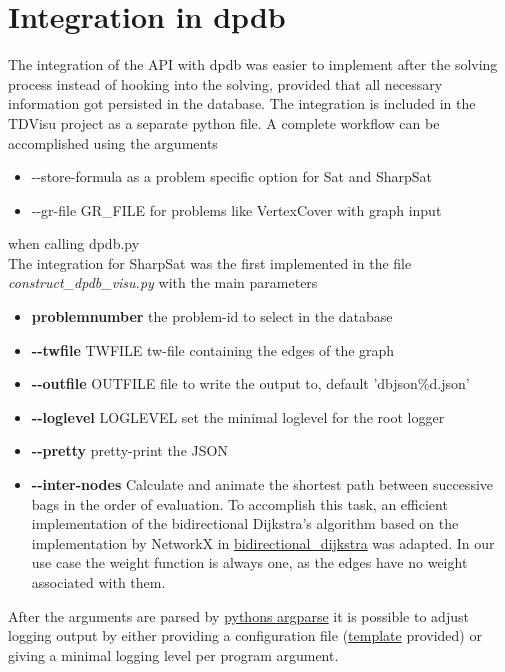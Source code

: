 \documentclass[a4paper, 12pt, bibliography=totoc]{scrartcl}
\begin{document}
\newpage
\section{Integration in dpdb}\label{sec:dpdb}
The integration of the API with dpdb was easier to implement after the solving process instead of hooking into the solving, 
provided that all necessary information got persisted in the database.
The integration is included in the TDVisu project as a separate python file.
A complete workflow can be accomplished using the arguments
\begin{itemize}
	\item -{}-store-formula as a problem specific option for Sat and SharpSat
	\item -{}-gr-file GR\_FILE for problems like VertexCover with graph input 
\end{itemize}
when calling dpdb.py\\
The integration for SharpSat was the first implemented in the file \textit{construct\_dpdb\_visu.py} with
the main parameters

\begin{itemize}
	\item
	\textbf{problemnumber}
	 the problem-id to select in the database
	 
	\item
	\textbf{-{}-twfile }TWFILE
	tw-file containing the edges of the graph 
	
	\item
	\textbf{-{}-outfile }OUTFILE
	 file to write the output to, default 'dbjson\%d.json'
	 
	\item
	\textbf{-{}-loglevel }LOGLEVEL
	 set the minimal loglevel for the root logger
	 
	\item
	\textbf{-{}-pretty}
	 pretty-print the JSON
	 
	\item
	\textbf{-{}-inter-nodes}
	Calculate and animate the shortest path between successive bags in the order of evaluation. To accomplish this task, an efficient implementation of the bidirectional Dijkstra's algorithm \cite{shortestPathAlgo} based on the implementation by NetworkX \cite{SciPyProceedings_11} in \href{https://networkx.github.io/documentation/networkx-2.1/reference/algorithms/generated/networkx.algorithms.shortest_paths.weighted.bidirectional_dijkstra.html#networkx.algorithms.shortest_paths.weighted.bidirectional_dijkstra}{bidirectional\_dijkstra} was adapted.
	In our use case the weight function is always one, as the edges have no weight associated with them.
\end{itemize}
After the arguments are parsed by \href{https://docs.python.org/3/library/argparse.html}{pythons argparse} it is possible to adjust logging output by either providing a configuration file (\href{https://github.com/VaeterchenFrost/tdvisu/blob/master/tdvisu/logging.yml}{template} provided) or giving a minimal logging level per program argument.
\end{document}
